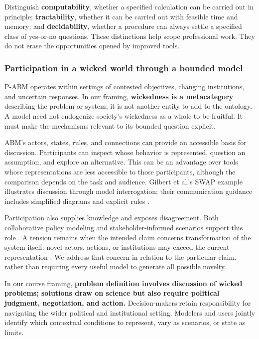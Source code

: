 \documentclass[11pt,a4paper]{article}
\begin{document}
Distinguish \textbf{computability}, whether a specified calculation can be carried out in principle; \textbf{tractability}, whether it can be carried out with feasible time and memory; and \textbf{decidability}, whether a procedure can always settle a specified class of yes-or-no questions. These distinctions help scope professional work. They do not erase the opportunities opened by improved tools.

\subsubsection{Participation in a wicked world through a bounded model}

P-ABM operates within settings of contested objectives, changing institutions, and uncertain responses. In our framing, \textbf{wickedness is a metacategory} describing the problem or system; it is not another entity to add to the ontology. A model need not endogenize society's wickedness as a whole to be fruitful. It must make the mechanisms relevant to its bounded question explicit.

ABM's actors, states, rules, and connections can provide an accessible basis for discussion. Participants can inspect whose behavior is represented, question an assumption, and explore an alternative. This can be an advantage over tools whose representations are less accessible to those participants, although the comparison depends on the task and audience. Gilbert et al.'s SWAP example illustrates discussion through model interrogation; their communication guidance includes simplified diagrams and explicit rules \cite[paras.~4.10--4.12, 5.4, 5.30]{gilbert_policy_2018}.

Participation also supplies knowledge and exposes disagreement. Both collaborative policy modeling and stakeholder-informed scenarios support this role \cite[paras.~5.18--5.22]{gilbert_policy_2018}\cite[para.~3.10]{polhill_prediction_2021}. A tension remains when the intended claim concerns transformation of the system itself: novel actors, actions, or institutions may exceed the current representation \cite[paras.~2.44, 3.9]{polhill_prediction_2021}. We address that concern in relation to the particular claim, rather than requiring every useful model to generate all possible novelty.

In our course framing, \textbf{problem definition involves discussion of wicked problems; solutions draw on science but also require political judgment, negotiation, and action.} Decision-makers retain responsibility for navigating the wider political and institutional setting. Modelers and users jointly identify which contextual conditions to represent, vary as scenarios, or state as limits.
\end{document}
